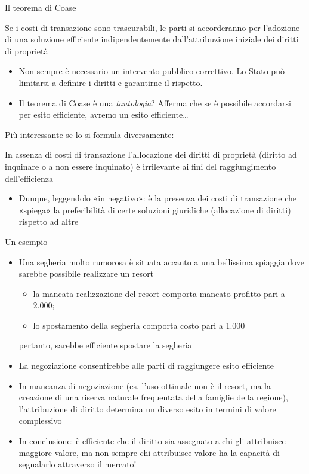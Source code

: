\documentclass[aspectratio=64,11pt]{beamer}
\begin{document}
\begin{frame}{Il teorema di Coase}
\vspace*{-2mm}
\begin{block}{}
Se i costi di transazione sono trascurabili, le parti si accorderanno per
l'adozione di una soluzione efficiente indipendentemente dall'attribuzione
iniziale dei diritti di proprietà
\end{block}
\begin{itemize}
\item Non sempre è necessario un intervento pubblico correttivo.  Lo Stato può
limitarsi a definire i diritti e garantirne il rispetto.
\item Il teorema di Coase è una \emph{tautologia}? Afferma che se è possibile
accordarsi per esito efficiente, avremo un esito efficiente\ldots{}
\end{itemize}

Più interessante se lo si formula diversamente:
\vspace{-2mm}
\begin{block}{}
In assenza di costi di transazione l'allocazione dei diritti di proprietà
(diritto ad inquinare o a non essere inquinato) è irrilevante ai fini del
raggiungimento dell'efficienza
\end{block}
\begin{itemize}
\item Dunque, leggendolo «in negativo»: è la presenza dei costi di transazione
che «spiega» la preferibilità di certe soluzioni giuridiche (allocazione
di diritti) rispetto ad altre
\end{itemize}
\end{frame}

\begin{frame}{Un esempio}
\begin{itemize}
\item Una segheria molto rumorosa è situata accanto a una bellissima spiaggia dove
sarebbe possibile realizzare un resort
\begin{itemize}
\item la mancata realizzazione del resort comporta mancato profitto pari a 2.000;
\item lo spostamento della segheria comporta costo pari a 1.000
\end{itemize}
pertanto, sarebbe efficiente spostare la segheria
\item La negoziazione consentirebbe alle parti di raggiungere esito efficiente
\item In mancanza di negoziazione (es. l’uso ottimale non è il resort, ma la
creazione di una riserva naturale frequentata della famiglie della regione),
l'attribuzione di diritto determina un diverso esito in termini di valore
complessivo
\item In conclusione: è efficiente che il diritto sia assegnato a chi gli
attribuisce maggiore valore, ma non sempre chi attribuisce valore ha la
capacità di segnalarlo attraverso il mercato!
\end{itemize}
\end{frame}
\end{document}
